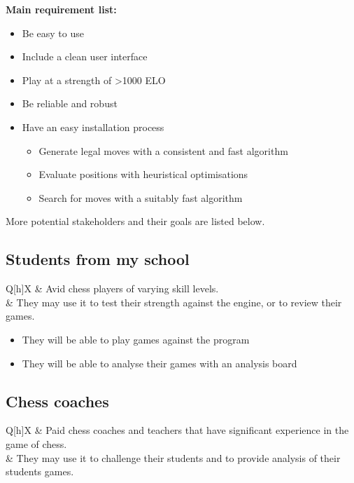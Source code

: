 \textbf{\large Main requirement list:}
\begin{itemize}
  \item Be easy to use
  \item Include a clean user interface
  \item Play at a strength of >1000 ELO
  \item Be reliable and robust
  \item Have an easy installation process

  \begin{itemize}
    \item{Generate legal moves with a consistent and fast
          algorithm}
    \item Evaluate positions with heuristical optimisations
    \item{Search for moves with a suitably fast algorithm}
  \end{itemize}

\end{itemize}

More potential stakeholders and their goals are listed below.
\subsection*{Students from my school}
\begin{tblr}{Q[h]X}
   & Avid chess players of varying skill 
  levels.\\
   & They may use it to test their
  strength against the engine, or to review their games.\\
\end{tblr}

\vspace{0.3cm}
\begin{itemize}
  \item They will be able to play games against the program
  \item{They will be able to analyse their games with an 
    analysis board}
\end{itemize}

\subsection*{Chess coaches}
\begin{tblr}{Q[h]X}
   & Paid chess coaches and teachers that 
  have significant experience in the game of chess.\\
   & They may use it to challenge their
  students and to provide analysis of their students games.\\
\end{tblr}

